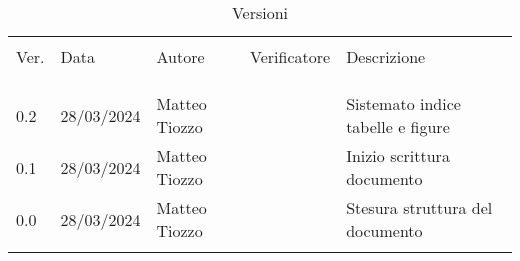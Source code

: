 \documentclass[italian,12pt]{article} %
\begin{document}


\newpage



\begin{table}[!h]
    \caption*{Versioni}
    \begin{center}
        \begin{tabular}{ l l l l p{9cm} }
            \hline                                                                                                          \\[-2ex]
            Ver. & Data       & Autore          & Verificatore              & Descrizione                                   \\
            \\[-2ex] \hline \\[-1.5ex]\\
            0.2  & 28/03/2024 & Matteo Tiozzo   &                           & Sistemato indice tabelle e figure\\
            0.1  & 28/03/2024 & Matteo Tiozzo   &                           & Inizio scrittura documento                    \\
            0.0  & 28/03/2024 & Matteo Tiozzo   &	                        & Stesura struttura del documento               \\
            \\[-1.5ex] \hline
        \end{tabular}
    \end{center}
\end{table}

\newpage

\tableofcontents

\newpage

\listoftables

\listoffigures

\newpage




\end{document}
